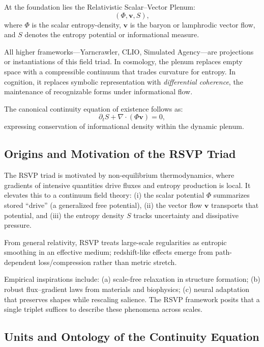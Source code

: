 \documentclass[12pt]{article}
\begin{document}
At the foundation lies the Relativistic Scalar--Vector Plenum:
\[
(\Phi, \mathbf{v}, S),
\]
where $\Phi$ is the scalar entropy-density, $\mathbf{v}$ is the baryon or lamphrodic vector flow, and $S$ denotes the entropy potential or informational measure.

All higher frameworks---Yarncrawler, CLIO, Simulated Agency---are projections or instantiations of this field triad.
In cosmology, the plenum replaces empty space with a compressible continuum that trades curvature for entropy.
In cognition, it replaces symbolic representation with \emph{differential coherence}, the maintenance of recognizable forms under informational flow.

The canonical continuity equation of existence follows as:
\begin{equation}
\partial_t S + \nabla \!\cdot (\Phi \mathbf{v}) = 0,
\end{equation}
expressing conservation of informational density within the dynamic plenum.

\subsection{Origins and Motivation of the RSVP Triad}

The RSVP triad is motivated by non-equilibrium thermodynamics, where gradients of intensive quantities drive fluxes and entropy production is local. It elevates this to a continuum field theory: (i) the scalar potential $\Phi$ summarizes stored “drive” (a generalized free potential), (ii) the vector flow $\mathbf{v}$ transports that potential, and (iii) the entropy density $S$ tracks uncertainty and dissipative pressure.

From general relativity, RSVP treats large-scale regularities as entropic smoothing in an effective medium; redshift-like effects emerge from path-dependent loss/compression rather than metric stretch.

Empirical inspirations include: (a) scale-free relaxation in structure formation; (b) robust flux–gradient laws from materials and biophysics; (c) neural adaptation that preserves shapes while rescaling salience. The RSVP framework posits that a single triplet suffices to describe these phenomena across scales.

\subsection{Units and Ontology of the Continuity Equation}
\end{document}
